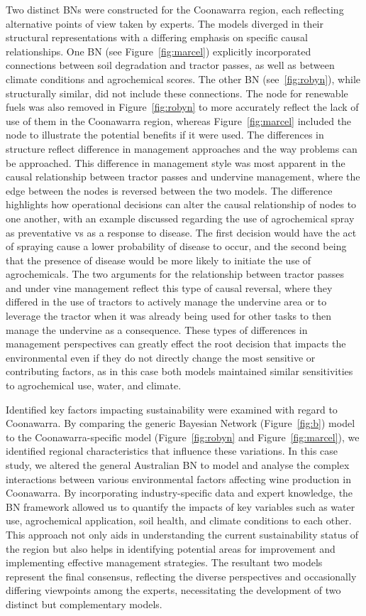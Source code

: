 \documentclass[fleqn,10pt]{wlscirep}
\begin{document}
Two distinct BNs were constructed for the Coonawarra region, each reflecting alternative points of view taken by experts. The models diverged in their structural representations with a differing emphasis on specific causal relationships. One BN (see Figure~\ref{fig:marcel}) explicitly incorporated connections between soil degradation and tractor passes, as well as between climate conditions and agrochemical scores. The other BN (see~\ref{fig:robyn}), while structurally similar, did not include these connections. The node for renewable fuels was also removed in Figure~\ref{fig:robyn} to more accurately reflect the lack of use of them in the Coonawarra region, whereas Figure~\ref{fig:marcel} included the node to illustrate the potential benefits if it were used. The differences in structure reflect difference in management approaches and the way problems can be approached. This difference in management style was most apparent in the causal relationship between tractor passes and undervine management, where the edge between the nodes is reversed between the two models. The difference highlights how operational decisions can alter the causal relationship of nodes to one another, with an example discussed regarding the use of agrochemical spray as preventative vs as a response to disease. The first decision would have the act of spraying cause a lower probability of disease to occur, and the second being that the presence of disease would be more likely to initiate the use of agrochemicals. The two arguments for the relationship between tractor passes and under vine management reflect this type of causal reversal, where they differed in the use of tractors to actively manage the undervine area or to leverage the tractor when it was already being used for other tasks to then manage the undervine as a consequence. These types of differences in management perspectives can greatly effect the root decision that impacts the environmental even if they do not directly change the most sensitive or contributing factors, as in this case both models maintained similar sensitivities to agrochemical use, water, and climate.

Identified key factors impacting sustainability were examined with regard to Coonawarra. By comparing the generic Bayesian Network (Figure~\ref{fig:b}) model to the Coonawarra-specific model (Figure~\ref{fig:robyn} and Figure~\ref{fig:marcel}), we identified regional characteristics that influence these variations. In this case study, we altered the general Australian BN to model and analyse the complex interactions between various environmental factors affecting wine production in Coonawarra. By incorporating industry-specific data and expert knowledge, the BN framework allowed us to quantify the impacts of key variables such as water use, agrochemical application, soil health, and climate conditions to each other. This approach not only aids in understanding the current sustainability status of the region but also helps in identifying potential areas for improvement and implementing effective management strategies. The resultant two models represent the final consensus, reflecting the diverse perspectives and occasionally differing viewpoints among the experts, necessitating the development of two distinct but complementary models.
\end{document}
